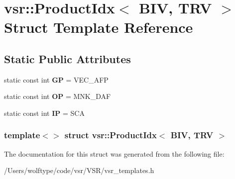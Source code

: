 \hypertarget{structvsr_1_1_product_idx_3_01_b_i_v_00_01_t_r_v_01_4}{\section{vsr\-:\-:Product\-Idx$<$ B\-I\-V, T\-R\-V $>$ Struct Template Reference}
\label{structvsr_1_1_product_idx_3_01_b_i_v_00_01_t_r_v_01_4}
}
\subsection*{Static Public Attributes}
\begin{DoxyCompactItemize}
\item 
\hypertarget{structvsr_1_1_product_idx_3_01_b_i_v_00_01_t_r_v_01_4_a70626ea4de68901d0bd33a14fb8ddaa6}{static const int {\bfseries G\-P} = V\-E\-C\-\_\-\-A\-F\-P}\label{structvsr_1_1_product_idx_3_01_b_i_v_00_01_t_r_v_01_4_a70626ea4de68901d0bd33a14fb8ddaa6}

\item 
\hypertarget{structvsr_1_1_product_idx_3_01_b_i_v_00_01_t_r_v_01_4_ac28a5993b2a19656cf605b668f701517}{static const int {\bfseries O\-P} = M\-N\-K\-\_\-\-D\-A\-F}\label{structvsr_1_1_product_idx_3_01_b_i_v_00_01_t_r_v_01_4_ac28a5993b2a19656cf605b668f701517}

\item 
\hypertarget{structvsr_1_1_product_idx_3_01_b_i_v_00_01_t_r_v_01_4_ac6972bca6d7b9e0a82ecae3820ca97b6}{static const int {\bfseries I\-P} = S\-C\-A}\label{structvsr_1_1_product_idx_3_01_b_i_v_00_01_t_r_v_01_4_ac6972bca6d7b9e0a82ecae3820ca97b6}

\end{DoxyCompactItemize}
\subsubsection*{template$<$$>$ struct vsr\-::\-Product\-Idx$<$ B\-I\-V, T\-R\-V $>$}



The documentation for this struct was generated from the following file\-:\begin{DoxyCompactItemize}
\item 
/\-Users/wolftype/code/vsr/\-V\-S\-R/vsr\-\_\-templates.\-h\end{DoxyCompactItemize}
